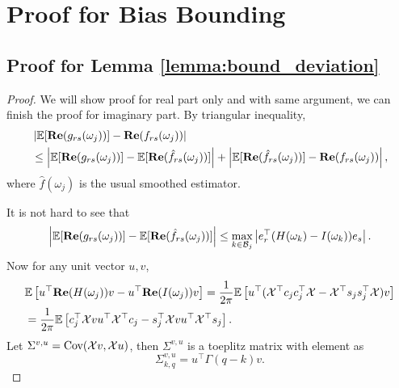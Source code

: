 \section{Proof for Bias Bounding}
\subsection{Proof for Lemma \ref{lemma:bound_deviation}}
\begin{proof}
We will show proof for real part only and with same argument, we can finish the proof for imaginary part. By triangular inequality, 
\begin{equation}
\label{eq:expectation_bias_decomposition}
\begin{aligned}
&\left|\mathbb{E}[{\bf Re}(g_{rs}(\omega_j))] - {\bf Re}(f_{rs}(\omega_j))\right| \\
&\le \left|\mathbb{E}[{\bf Re}(g_{rs}(\omega_j))] - \mathbb{E}[{\bf Re}(\hat{f}_{rs}(\omega_j))] \right| + \left|\mathbb{E}[{\bf Re}(\hat{f}_{rs}(\omega_j))] - {\bf Re}(f_{rs}(\omega_j))\right|,
\end{aligned}
\end{equation}
where $\hat{f}(\omega_j)$ is the usual smoothed estimator. \par 
It is not hard to see that 
\begin{equation}
\left|\mathbb{E}[{\bf Re}(g_{rs}(\omega_j))] - \mathbb{E}[{\bf Re}(\hat{f}_{rs}(\omega_j))] \right| \le \max_{k\in \mathcal{B}_j} \left| e_r^\top   (H(\omega_k) - I(\omega_k)) e_s\right|. 
\end{equation}
Now for any unit vector $u,v$, 
\begin{equation}
\begin{aligned}
\label{eq:ada_periodogram_real_part_dif}
&\mathbb{E} \left [u^\top  {\bf Re}(H(\omega_j))v - u^\top  {\bf Re}(I(\omega_j))v\right] = \frac{1}{2\pi} \mathbb{E}\left[u^\top  (\mathcal{X}^\top  c_jc_j^\top   \mathcal{X} -  \mathcal{X}^\top  s_js_j^\top   \mathcal{X})v\right]\\
&=\frac{1}{2\pi} \mathbb{E}\left[c_j^\top   \mathcal{X}vu^\top  \mathcal{X}^\top   c_j - s_j^\top   \mathcal{X}vu^\top   \mathcal{X}^\top  s_j\right].
\end{aligned}
\end{equation}
Let $\Sigma^{v,u} = \mbox{Cov}(\mathcal{X}v, \mathcal{X}u)$, then $\Sigma^{v,u}$ is a toeplitz matrix with element as 
\begin{equation}
\Sigma^{v,u}_{k,q} = u^\top  \Gamma(q-k)v.
\end{equation}

\end{proof}
